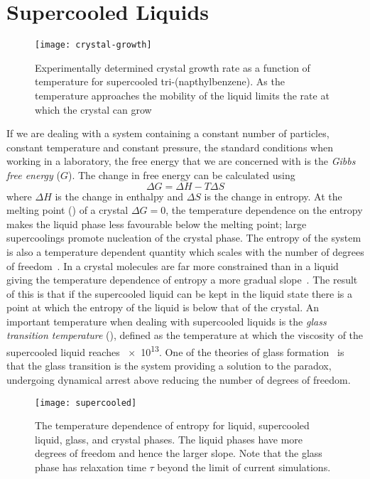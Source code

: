 
\section{Supercooled Liquids}

\begin{figure}
    \centering
    \texttt{[image: crystal-growth]}
    \caption[Crystal growth rate as a function of temperature]{Experimentally determined crystal growth rate as a function of temperature for supercooled tri-(napthylbenzene). As the temperature approaches \si{\Tg} the mobility of the liquid limits the rate at which the crystal can grow}
    \label{fig:crys rate}
\end{figure}

If we are dealing with a system containing a constant number of particles, constant temperature and constant pressure, the standard conditions when working in a laboratory, the free energy that we are concerned with is the \emph{Gibbs free energy} ($G$). The change in free energy can be calculated using
\begin{equation}
    \Delta G = \Delta H - T\Delta S
\end{equation}
where $\Delta H$ is the change in enthalpy and $\Delta S$ is the change in entropy. At the melting point (\si{\Tm}) of a crystal $\Delta G = 0$, the temperature dependence on the entropy makes the liquid phase less favourable below the melting point; large supercoolings promote nucleation of the crystal phase. The entropy of the system is also a temperature dependent quantity which scales with the number of degrees of freedom~. In a crystal molecules are far more constrained than in a liquid giving the temperature dependence of entropy a more gradual slope~. The result of this is that if the supercooled liquid can be kept in the liquid state there is a point at which the entropy of the liquid is below that of the crystal. An important temperature when dealing with supercooled liquids is the \emph{glass transition temperature} (\si{\Tg}), defined as the temperature at which the viscosity of the supercooled liquid reaches \SI{e13}{\poise}. One of the theories of glass formation~\cite{debenedetti:01} is that the glass transition is the system providing a solution to the paradox, undergoing dynamical arrest above \si{\Tk} reducing the number of degrees of freedom.

\begin{figure}
    \centering
    \texttt{[image: supercooled]}
    \caption{The temperature dependence of entropy for liquid, supercooled liquid, glass, and crystal phases. The liquid phases have more degrees of freedom and hence the larger slope. Note that the glass phase has relaxation time $\tau$ beyond the limit of current simulations.}
    \label{fig:entropy}
\end{figure}


